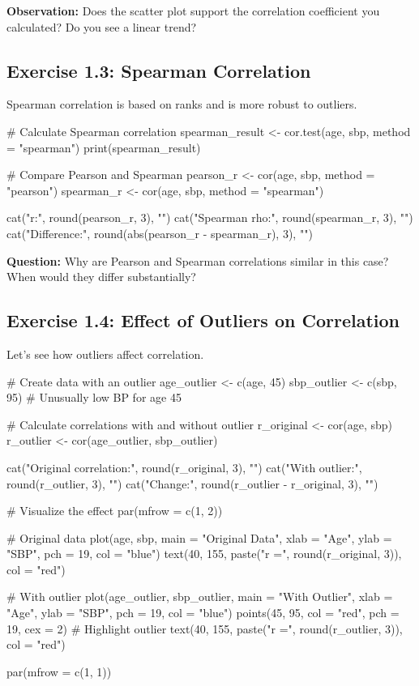 \documentclass[11pt]{article}
\begin{document}
\textbf{Observation:} Does the scatter plot support the correlation coefficient you calculated? Do you see a linear trend?

\vspace{1cm}

\subsection{Exercise 1.3: Spearman Correlation}

Spearman correlation is based on ranks and is more robust to outliers.

\begin{rcode}
# Calculate Spearman correlation
spearman_result <- cor.test(age, sbp, method = "spearman")
print(spearman_result)

# Compare Pearson and Spearman
pearson_r <- cor(age, sbp, method = "pearson")
spearman_r <- cor(age, sbp, method = "spearman")

cat("\nPearson r:", round(pearson_r, 3), "\n")
cat("Spearman rho:", round(spearman_r, 3), "\n")
cat("Difference:", round(abs(pearson_r - spearman_r), 3), "\n")
\end{rcode}

\textbf{Question:} Why are Pearson and Spearman correlations similar in this case? When would they differ substantially?

\vspace{1.5cm}

\subsection{Exercise 1.4: Effect of Outliers on Correlation}

Let's see how outliers affect correlation.

\begin{rcode}
# Create data with an outlier
age_outlier <- c(age, 45)
sbp_outlier <- c(sbp, 95)  # Unusually low BP for age 45

# Calculate correlations with and without outlier
r_original <- cor(age, sbp)
r_outlier <- cor(age_outlier, sbp_outlier)

cat("Original correlation:", round(r_original, 3), "\n")
cat("With outlier:", round(r_outlier, 3), "\n")
cat("Change:", round(r_outlier - r_original, 3), "\n")

# Visualize the effect
par(mfrow = c(1, 2))

# Original data
plot(age, sbp, main = "Original Data",
     xlab = "Age", ylab = "SBP", pch = 19, col = "blue")
text(40, 155, paste("r =", round(r_original, 3)), col = "red")

# With outlier
plot(age_outlier, sbp_outlier, main = "With Outlier",
     xlab = "Age", ylab = "SBP", pch = 19, col = "blue")
points(45, 95, col = "red", pch = 19, cex = 2)  # Highlight outlier
text(40, 155, paste("r =", round(r_outlier, 3)), col = "red")

par(mfrow = c(1, 1))
\end{rcode}
\end{document}
